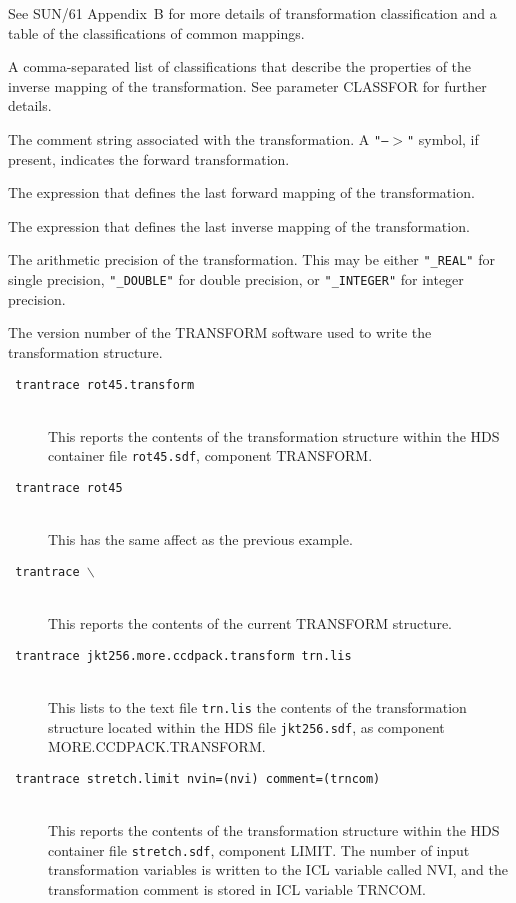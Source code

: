 \documentclass[twoside,11pt]{article}
\newcommand{\htmlref}[2]{#1}
\newcommand{\sstexamples}[1]{
   \goodbreak
   \item[Examples:] \mbox{} \\
   \vspace{-3.5ex}
   \begin{description}
      #1
   \end{description}
}
\newcommand{\sstsubsection}[1]{ \item[{#1}] \mbox{} \\}
\newcommand{\sstexamplesubsection}[2]{\sloppy \item{\ssttt #1} \mbox{} \\ #2 }
\newcommand{\sstnotes}[1]{\pagebreak[3] \item[Notes:] \mbox{} \\[1.3ex] #1}
\newenvironment{sstitemize}{%
  \vspace{-4.3ex}\begin{itemize}}{\end{itemize}}
\newcommand{\sstitemlist}[1]{
  \mbox{} \\
  \vspace{-3.5ex}
  \begin{sstitemize}
     #1
  \end{sstitemize}
}
\newcommand{\ssttt}{\tt}
\renewcommand{\sstexamples}[1]{
      \htmlref{\item[Examples:]}{ap:example}
      \begin{description}
         #1
      \end{description}
   }
\renewcommand{\sstsubsection}[1]{\item[{#1}]}
\renewcommand{\sstexamplesubsection}[2]{\item[{\ssttt #1}] \\ #2}
\renewcommand{\sstnotes}[1]{\item[Notes:]
      \begin{description}
         #1
      \end{description}
   }
\newcommand{\sstitemlist}[1]{
      \begin{itemize}
         #1
      \end{itemize}
   }
\begin{document}
{{{         See SUN/61 Appendix~B for more details of transformation
         classification and a table of the classifications of common
         mappings.
      }
      \sstsubsection{
         CLASSINV = LITERAL (Write)
      }{
         A comma-separated list of classifications that describe the
         properties of the inverse mapping of the transformation.  See
         parameter CLASSFOR for further details.
      }
      \sstsubsection{
         COMMENT = LITERAL (Write)
      }{
         The comment string associated with the transformation.  A
         {\tt "--$>$"} symbol, if present, indicates the forward
         transformation.
      }
      \sstsubsection{
         FORWARD = LITERAL (Write)
      }{
         The expression that defines the last forward mapping of the
         transformation.
      }
      \sstsubsection{
         INVERSE = LITERAL (Write)
      }{
         The expression that defines the last inverse mapping of the
         transformation.
      }
      \sstsubsection{
         PREC = LITERAL (Write)
      }{
         The arithmetic precision of the transformation.  This may be
         either {\tt "\_REAL"} for single precision, {\tt "\_DOUBLE"} for double
         precision, or {\tt "\_INTEGER"} for integer precision.
      }
      \sstsubsection{
         VERSION = LITERAL (Write)
      }{
         The version number of the TRANSFORM software used to write the
         transformation structure.
      }
   }
   \sstexamples{
      \sstexamplesubsection{
         trantrace rot45.transform
      }{
         This reports the contents of the transformation structure within
         the HDS container file {\tt rot45.sdf}, component TRANSFORM.
      }
      \sstexamplesubsection{
         trantrace rot45
      }{
         This has the same affect as the previous example.
      }
      \sstexamplesubsection{
         trantrace $\backslash$
      }{
         This reports the contents of the current TRANSFORM structure.
      }
      \sstexamplesubsection{
         trantrace jkt256.more.ccdpack.transform trn.lis
      }{
         This lists to the text file {\tt trn.lis} the contents of the
         transformation structure located within the HDS file
         {\tt jkt256.sdf}, as component MORE.CCDPACK.TRANSFORM.
      }
      \sstexamplesubsection{
         trantrace stretch.limit nvin=(nvi) comment=(trncom)
      }{
         This reports the contents of the transformation structure within
         the HDS container file {\tt stretch.sdf}, component LIMIT.  The
         number of input transformation variables is written to the
         {\footnotesize ICL} variable called NVI, and the
         transformation comment is stored in {\footnotesize ICL}
         variable TRNCOM.
      }
   }
   \sstnotes{
      \sstitemlist{

}}}
\end{document}

